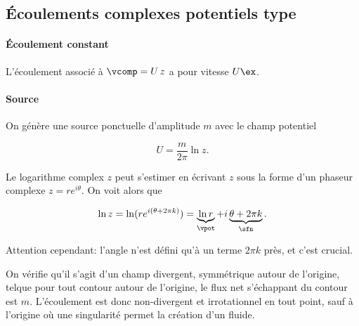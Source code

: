 \subsection{Écoulements complexes potentiels type}

\paragraph{Écoulement constant}

L'écoulement associé à $\vcomp = U\,z$ a pour vitesse $U\ex$. 


\paragraph{Source}

On génère une source ponctuelle d'amplitude $m$ avec le champ potentiel

\begin{displaymath}
  U = \frac{m}{2\pi}\ln z. 
\end{displaymath}

Le logarithme complex $z$ peut s'estimer en écrivant $z$ sous la forme d'un phaseur complexe $z=re^{i\theta}$. On voit alors que 

\begin{displaymath}
  \ln z = \ln (re^{i(\theta + 2\pi k)}) = \underbrace{\ln r}_{\vpot} + i\underbrace{\theta + 2\pi k}_{\sfn}. 
\end{displaymath}

Attention cependant: l'angle n'est défini qu'à un terme $2\pi k$ près, et c'est crucial. 

On vérifie qu'il s'agit d'un champ divergent, symmétrique autour de l'origine, telque pour tout contour autour de l'origine, le flux net s'échappant du contour est $m$. L'écoulement est donc non-divergent et irrotationnel en tout point, sauf à l'origine où une singularité permet la création d'un fluide. 

